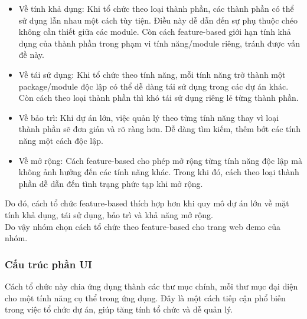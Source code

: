 \begin{itemize}
    \item Về tính khả dụng: Khi tổ chức theo loại thành phần, các thành phần có thể sử dụng lẫn nhau một cách tùy tiện. Điều này dễ dẫn đến sự phụ thuộc chéo không cần thiết giữa các module. Còn cách feature-based giới hạn tính khả dụng của thành phần trong phạm vi tính năng/module riêng, tránh được vấn đề này.
   
    \item Về tái sử dụng: Khi tổ chức theo tính năng, mỗi tính năng trở thành một package/module độc lập có thể dễ dàng tái sử dụng trong các dự án khác. Còn cách theo loại thành phần thì khó tái sử dụng riêng lẻ từng thành phần.
   
    \item Về bảo trì: Khi dự án lớn, việc quản lý theo từng tính năng thay vì loại thành phần sẽ đơn giản và rõ ràng hơn. Dễ dàng tìm kiếm, thêm bớt các tính năng một cách độc lập.
    
    \item Về mở rộng: Cách feature-based cho phép mở rộng từng tính năng độc lập mà không ảnh hưởng đến các tính năng khác. Trong khi đó, cách theo loại thành phần dễ dẫn đến tình trạng phức tạp khi mở rộng.
\end{itemize}

Do đó, cách tổ chức feature-based thích hợp hơn khi quy mô dự án lớn về mặt tính khả dụng, tái sử dụng, bảo trì và khả năng mở rộng.\\

Do vậy nhóm chọn cách tổ chức theo feature-based cho trang web demo của nhóm.
\subsubsection{Cấu trúc phần UI}
Cách tổ chức này chia ứng dụng thành các thư mục chính, mỗi thư mục đại diện cho một tính năng cụ thể trong ứng dụng. Đây là một cách tiếp cận phổ biến trong việc tổ chức dự án, giúp tăng tính tổ chức và dễ quản lý.

